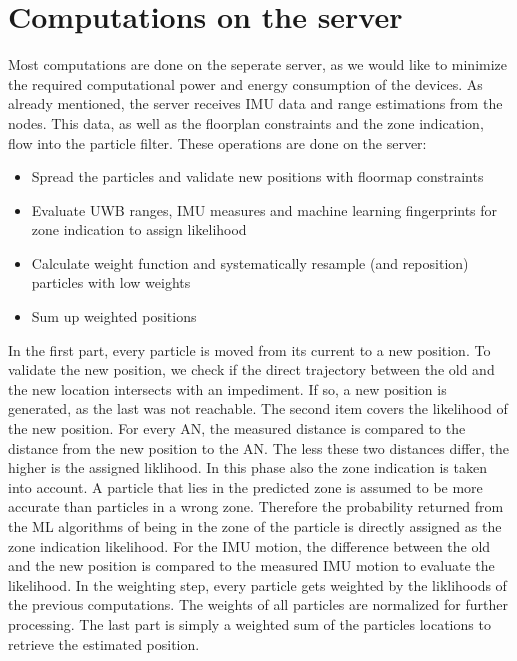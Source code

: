 \section{Computations on the server}
Most computations are done on the seperate server, as we would like to minimize the required computational power and energy consumption of the devices. As already mentioned, the server receives IMU data and range estimations from the nodes. This data, as well as the floorplan constraints and the zone indication, flow into the particle filter. These operations are done on the server:
\begin{itemize}
\item Spread the particles and validate new positions with floormap constraints
\item Evaluate UWB ranges, IMU measures and machine learning fingerprints for zone indication to assign likelihood
\item Calculate weight function and systematically resample (and reposition) particles with low weights
\item Sum up weighted positions
\end{itemize}

In the first part, every particle is moved from its current to a new position. To validate the new position, we check if the direct trajectory between the old and the new location intersects with an impediment. If so, a new position is generated, as the last was not reachable.
The second item covers the likelihood of the new position. For every AN, the measured distance is compared to the distance from the new position to the AN. The less these two distances differ, the higher is the assigned liklihood. In this phase also the zone indication is taken into account. A particle that lies in the predicted zone is assumed to be more accurate than particles in a wrong zone. Therefore the probability returned from the ML algorithms of being in the zone of the particle is directly assigned as the zone indication likelihood. For the IMU motion, the difference between the old and the new position is compared to the measured IMU motion to evaluate the likelihood.
In the weighting step, every particle gets weighted by the liklihoods of the previous computations. The weights of all particles are normalized for further processing.
The last part is simply a weighted sum of the particles locations to retrieve the estimated position.